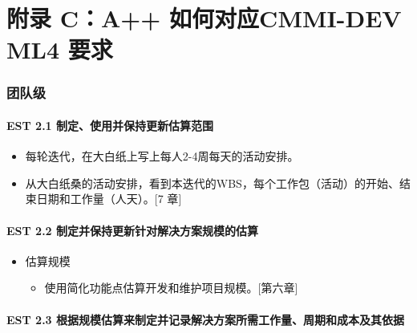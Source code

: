 \chapter{附录 C：A++ 如何对应CMMI-DEV ML4 要求} %

\hypertarget{ux56e2ux961fux7ea7}{%
\subsection{团队级}\label{ux56e2ux961fux7ea7}}

\hypertarget{est-2.1-ux5236ux5b9aux4f7fux7528ux5e76ux4fddux6301ux66f4ux65b0ux4f30ux7b97ux8303ux56f4}{%
\subsubsection{EST 2.1
制定、使用并保持更新估算范围}\label{est-2.1-ux5236ux5b9aux4f7fux7528ux5e76ux4fddux6301ux66f4ux65b0ux4f30ux7b97ux8303ux56f4}}

\begin{itemize}
\tightlist
\item
  每轮迭代，在大白纸上写上每人2-4周每天的活动安排。
\item
  从大白纸桑的活动安排，看到本迭代的WBS，每个工作包（活动）的开始、结束日期和工作量（人天）。{[}7
  章{]}
\end{itemize}

\hypertarget{est-2.2-ux5236ux5b9aux5e76ux4fddux6301ux66f4ux65b0ux9488ux5bf9ux89e3ux51b3ux65b9ux6848ux89c4ux6a21ux7684ux4f30ux7b97}{%
\subsubsection{EST 2.2
制定并保持更新针对解决方案规模的估算}\label{est-2.2-ux5236ux5b9aux5e76ux4fddux6301ux66f4ux65b0ux9488ux5bf9ux89e3ux51b3ux65b9ux6848ux89c4ux6a21ux7684ux4f30ux7b97}}

\begin{itemize}
\tightlist
\item
  估算规模

  \begin{itemize}
  \tightlist
  \item
    使用简化功能点估算开发和维护项目规模。{[}第六章{]}
  \end{itemize}
\end{itemize}

\hypertarget{est-2.3-ux6839ux636eux89c4ux6a21ux4f30ux7b97ux6765ux5236ux5b9aux5e76ux8bb0ux5f55ux89e3ux51b3ux65b9ux6848ux6240ux9700ux5de5ux4f5cux91cfux5468ux671fux548cux6210ux672cux53caux5176ux4f9dux636e}{%
\subsubsection{EST 2.3
根据规模估算来制定并记录解决方案所需工作量、周期和成本及其依据}\label{est-2.3-ux6839ux636eux89c4ux6a21ux4f30ux7b97ux6765ux5236ux5b9aux5e76ux8bb0ux5f55ux89e3ux51b3ux65b9ux6848ux6240ux9700ux5de5ux4f5cux91cfux5468ux671fux548cux6210ux672cux53caux5176ux4f9dux636e}}

